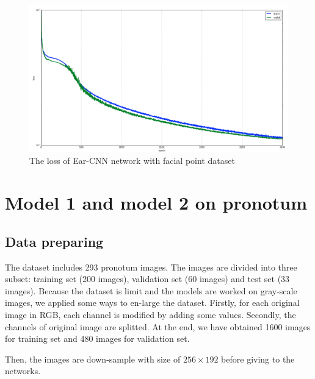 \begin{figure}[h!]
	\centering
	\includegraphics[scale=0.27]{images/trainloss}
	\caption{The loss of Ear-CNN network with facial point dataset}
	\label{earLosstrain}
\end{figure}
\section{Model 1 and model 2 on pronotum}
\subsection{Data preparing}
The dataset includes 293 pronotum images. The images are divided into three subset: training set (200 images), validation set (60 images) and test set (33 images). Because the dataset is limit and the models are worked on gray-scale images, we applied some ways to en-large the dataset. Firstly, for each original image in RGB, each channel is modified by adding some values. Secondly, the channels of original image are splitted. At the end, we have obtained 1600 images for training set and 480 images for validation set.

Then, the images are down-sample with size of $256 \times 192$ before giving to the networks.
